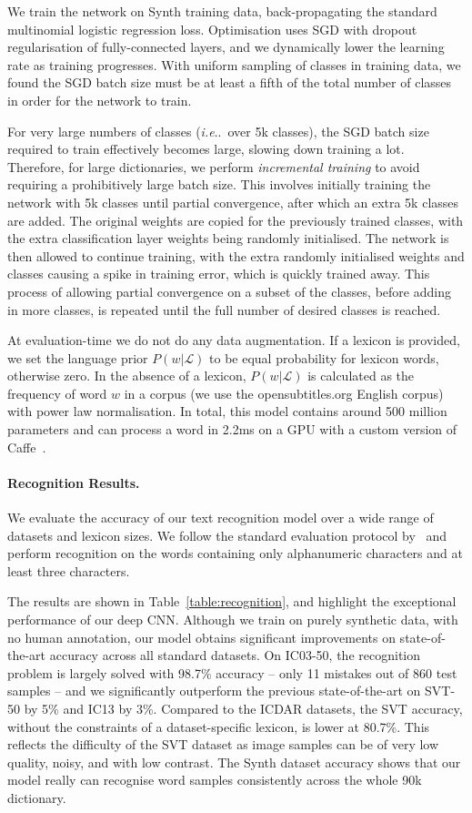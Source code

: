 \documentclass[twocolumn]{svjour3}          \smartqed  \usepackage{epsfig}
\makeatletter
\DeclareRobustCommand\onedot{\futurelet\@let@token\@onedot}
\def\@onedot{\ifx\@let@token.\else.\null\fi\xspace}
\def\ie{\emph{i.e}\onedot} \def\Ie{\emph{I.e}\onedot}
\makeatother
\begin{document}
We train the network on Synth training data, back-propagating the standard multinomial logistic regression loss. Optimisation uses SGD with dropout regularisation of fully-connected layers, and we dynamically lower the learning rate as training progresses. With uniform sampling of classes in training data, we found the SGD batch size must be at least a fifth of the total number of classes in order for the network to train. 

For very large numbers of classes (\ie~over 5k classes), the SGD batch size required to train effectively becomes large, slowing down training a lot. Therefore, for large dictionaries, we perform \emph{incremental training} to avoid requiring a prohibitively large batch size. This involves initially training the network with 5k classes until partial convergence, after which an extra 5k classes are added. The original weights are copied for the previously trained classes, with the extra classification layer weights being randomly initialised. The network is then allowed to continue training, with the extra randomly initialised weights and classes causing a spike in training error, which is quickly trained away. This process of allowing partial convergence on a subset of the classes, before adding in more classes, is repeated until the full number of desired classes is reached.

At evaluation-time we do not do any data augmentation. If a lexicon is provided, we set the language prior $P(w|\mathcal{L})$ to be equal probability for lexicon words, otherwise zero. In the absence of a lexicon, $P(w|\mathcal{L})$ is calculated as the frequency of word $w$ in a corpus (we use the opensubtitles.org English corpus) with power law normalisation. In total, this model contains around 500 million parameters and can process a word in 2.2ms on a GPU with a custom version of Caffe~\cite{Jia13}.

\paragraph{Recognition Results.}
We evaluate the accuracy of our text recognition model over a wide range of datasets and lexicon sizes. We follow the standard evaluation protocol by~\cite{Wang11} and perform recognition on the words containing only alphanumeric characters and at least three characters.

The results are shown in Table~\ref{table:recognition}, and highlight the exceptional performance of our deep CNN. Although we train on purely synthetic data, with no human annotation, our model obtains significant improvements on state-of-the-art accuracy across all standard datasets. On IC03-50, the recognition problem is largely solved with 98.7\% accuracy -- only 11 mistakes out of 860 test samples -- and we significantly outperform the previous state-of-the-art \cite{Bissacco13} on SVT-50 by 5\% and IC13 by 3\%. Compared to the ICDAR datasets, the SVT accuracy, without the constraints of a dataset-specific lexicon, is lower at 80.7\%. This reflects the difficulty of the SVT dataset as image samples can be of very low quality, noisy, and with low contrast. The Synth dataset accuracy shows that our model really can recognise word samples consistently across the whole 90k dictionary.
\end{document}
